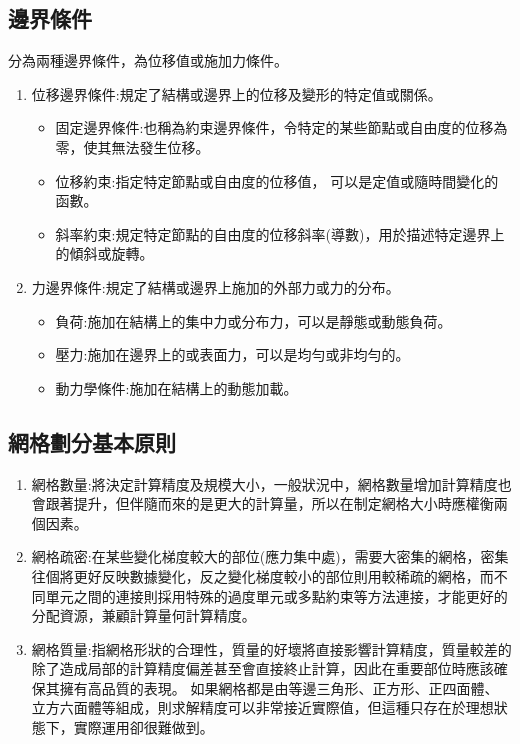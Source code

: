 \subsection{邊界條件}
分為兩種邊界條件，為位移值或施加力條件。

\begin{enumerate}
\item 位移邊界條件:規定了結構或邊界上的位移及變形的特定值或關係。

\begin{itemize}
\item 固定邊界條件:也稱為約束邊界條件，令特定的某些節點或自由度的位移為零，使其無法發生位移。
\item 位移約束:指定特定節點或自由度的位移值， 可以是定值或隨時間變化的函數。
\item 斜率約束:規定特定節點的自由度的位移斜率(導數)，用於描述特定邊界上的傾斜或旋轉。
\end{itemize}

\item 力邊界條件:規定了結構或邊界上施加的外部力或力的分布。

\begin{itemize}
\item 負荷:施加在結構上的集中力或分布力，可以是靜態或動態負荷。
\item 壓力:施加在邊界上的或表面力，可以是均勻或非均勻的。
\item 動力學條件:施加在結構上的動態加載。\
\end{itemize}
\end{enumerate}
\newpage

\subsection{網格劃分基本原則}
\begin{enumerate}
\item 網格數量:將決定計算精度及規模大小，一般狀況中，網格數量增加計算精度也會跟著提升，但伴隨而來的是更大的計算量，所以在制定網格大小時應權衡兩個因素。
\item 網格疏密:在某些變化梯度較大的部位(應力集中處)，需要大密集的網格，密集往個將更好反映數據變化，反之變化梯度較小的部位則用較稀疏的網格，而不同單元之間的連接則採用特殊的過度單元或多點約束等方法連接，才能更好的分配資源，兼顧計算量何計算精度。
\item 網格質量:指網格形狀的合理性，質量的好壞將直接影響計算精度，質量較差的除了造成局部的計算精度偏差甚至會直接終止計算，因此在重要部位時應該確保其擁有高品質的表現。
如果網格都是由等邊三角形、正方形、正四面體、立方六面體等組成，則求解精度可以非常接近實際值，但這種只存在於理想狀態下，實際運用卻很難做到。\
\end{enumerate}


